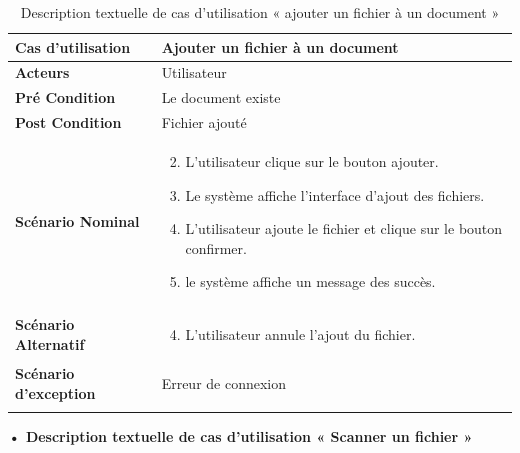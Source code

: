 \begin{longtable}{|p{5cm}|p{10cm}|}
\hline
\textbf{Cas d'utilisation}&Ajouter un fichier à un document\\
\hline
\textbf{Acteurs}&Utilisateur\\
\hline
\textbf{Pré Condition}&Le document existe\\
\hline
\textbf{Post Condition}&Fichier ajouté\\
\hline
\textbf{Scénario Nominal}&
\vspace{-\baselineskip}
\begin{enumerate}
    \setcounter{enumi}{1}
    \item L'utilisateur clique sur le bouton ajouter.
    \item Le système affiche l'interface d'ajout des fichiers.
    \item L'utilisateur ajoute le fichier et clique sur le bouton confirmer.
    \item le système affiche un message des succès.
    
    
\end{enumerate}\\
\hline
\textbf{Scénario Alternatif}&
\vspace{-\baselineskip}
\begin{enumerate}
    \setcounter{enumi}{3}
    \item L'utilisateur annule l'ajout du fichier.
\end{enumerate}\\
\hline
\textbf{Scénario d'exception}&Erreur de connexion\\
\hline
\caption{Description textuelle de cas d'utilisation « ajouter un fichier à un document »}
\label{tab:DescriptionTextuelleDeCasDUtilisationAjouterUnFichierAUnDocument}

\end{longtable}

\textbf{•	Description textuelle de cas d'utilisation « Scanner un fichier »}

